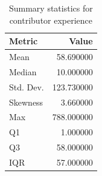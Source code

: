 \begin{table}
\caption{Summary statistics for contributor experience}
\label{tab:contributor-experience}
\begin{tabular}{lr}
\toprule
Metric & Value \\
\midrule
Mean & 58.690000 \\
Median & 10.000000 \\
Std. Dev. & 123.730000 \\
Skewness & 3.660000 \\
Max & 788.000000 \\
Q1 & 1.000000 \\
Q3 & 58.000000 \\
IQR & 57.000000 \\
\bottomrule
\end{tabular}
\end{table}
